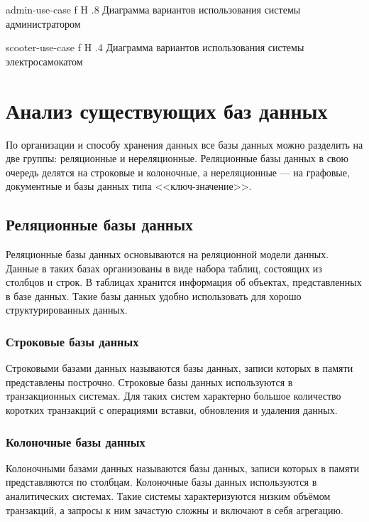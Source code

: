     {admin-use-case}
    {f}
    {H}
    {.8\textwidth}
    {Диаграмма вариантов использования системы администратором}

    {scooter-use-case}
    {f}
    {H}
    {.4\textwidth}
    {Диаграмма вариантов использования системы электросамокатом}

\section{Анализ существующих баз данных}

По организации и способу хранения данных все базы данных можно разделить на две группы: реляционные и нереляционные. Реляционные базы данных в свою очередь делятся на строковые и колоночные, а нереляционные --- на графовые, документные и базы данных типа <<ключ-значение>>.

\subsection{Реляционные базы данных}

Реляционные базы данных основываются на реляционной модели данных. Данные в таких базах организованы в виде набора таблиц, состоящих из столбцов и строк. В таблицах хранится информация об объектах, представленных в базе данных. Такие базы данных удобно использовать для хорошо структурированных данных.

\subsubsection{Строковые базы данных}

Строковыми базами данных называются базы данных, записи которых в памяти представлены построчно. Строковые базы данных используются в транзакционных системах. Для таких систем характерно большое количество коротких транзакций с операциями вставки, обновления и удаления данных.

\subsubsection{Колоночные базы данных}

Колоночными базами данных называются базы данных, записи которых в памяти представляются по столбцам. Колоночные базы данных используются в аналитических системах. Такие системы характеризуются низким объёмом транзакций, а запросы к ним зачастую сложны и включают в себя агрегацию.

